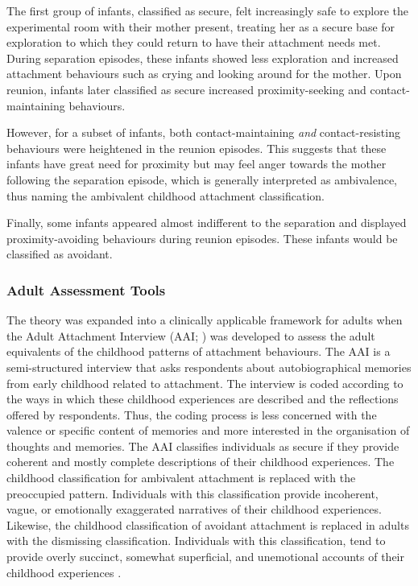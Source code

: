 \documentclass[12pt]{report}
\begin{document}
The first group of infants, classified as secure, felt increasingly safe to explore the experimental room with their mother present, treating her as a secure base for exploration to which they could return to have their attachment needs met.
During separation episodes, these infants showed less exploration and increased attachment behaviours such as crying and looking around for the mother. Upon reunion, infants later classified as secure increased proximity-seeking and contact-maintaining behaviours.

However, for a subset of infants, both contact-maintaining \textit{and} contact-resisting behaviours were heightened in the reunion episodes.
This suggests that these infants have great need for proximity but may feel anger towards the mother following the separation episode, which is generally interpreted as ambivalence, thus naming the ambivalent childhood attachment classification.

Finally, some infants appeared almost indifferent to the separation and displayed proximity-avoiding behaviours during reunion episodes.
These infants would be classified as avoidant.

\subsubsection{Adult Assessment Tools}
The theory was expanded into a clinically applicable framework for adults when the Adult Attachment Interview (AAI; \cite{AAITest}) was developed to assess the adult equivalents of the childhood patterns of attachment behaviours.
The AAI is a semi-structured interview that asks respondents about autobiographical memories from early childhood related to attachment.
The interview is coded according to the ways in which these childhood experiences are described and the reflections offered by respondents.
Thus, the coding process is less concerned with the valence or specific content of memories and more interested in the organisation of thoughts and memories.
The AAI classifies individuals as secure if they provide coherent and mostly complete descriptions of their childhood experiences.
The childhood classification for ambivalent attachment is replaced with the preoccupied pattern.
Individuals with this classification provide incoherent, vague, or emotionally exaggerated narratives of their childhood experiences.
Likewise, the childhood classification of avoidant attachment is replaced in adults with the dismissing classification.
Individuals with this classification, tend to provide overly succinct, somewhat superficial, and unemotional accounts of their childhood experiences \cite{Hesse1999, AAITest}.
\end{document}
